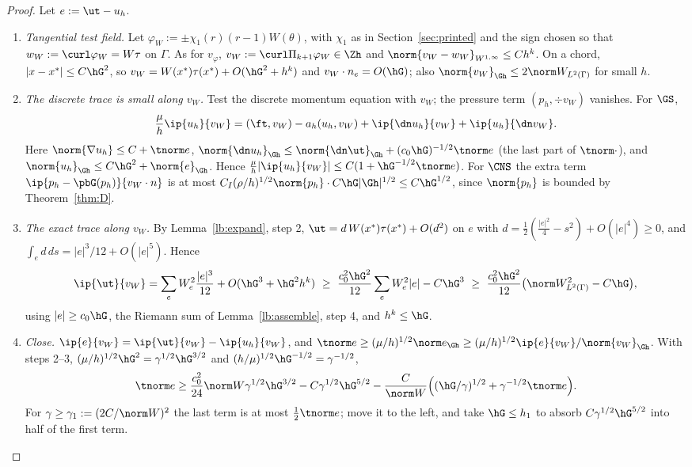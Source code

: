 \begin{proof}
Let $e:=\ut-u_h$.
\begin{enumerate}
\item \emph{Tangential test field.} Let $\varphi_W:=\pm\chi_1(r)(r-1)W(\theta)$, with $\chi_1$ as in Section~\ref{sec:printed} and the sign chosen so that $w_W:=\curl\varphi_W=W\tau$ on $\Gamma$. As for $v_\varphi$, $v_W:=\curl\Pi_{k+1}\varphi_W\in\Zh$ and $\norm{v_W-w_W}_{W^{1,\infty}}\le Ch^k$. On a chord, $|x-x^\ast|\le C\hG^2$, so $v_W=W(x^\ast)\tau(x^\ast)+O(\hG^2+h^k)$ and $v_W\cdot n_e=O(\hG)$; also $\norm{v_W}_{\Gh}\le2\norm W_{L^2(\Gamma)}$ for small $h$.
\item \emph{The discrete trace is small along $v_W$.} Test the discrete momentum equation with $v_W$; the pressure term $(p_h,\div v_W)$ vanishes. For $\GS$,
\[
\frac\mu h\ip{u_h}{v_W}=(\ft,v_W)-a_h(u_h,v_W)+\ip{\dn u_h}{v_W}+\ip{u_h}{\dn v_W} .
\]
Here $\norm{\nabla u_h}\le C+\tnorm e$, $\norm{\dn u_h}_{\Gh}\le\norm{\dn\ut}_{\Gh}+(c_0\hG)^{-1/2}\tnorm e$ (the last part of $\tnorm\cdot$), and $\norm{u_h}_{\Gh}\le C\hG^2+\norm{e}_{\Gh}$. Hence $\frac\mu h|\ip{u_h}{v_W}|\le C(1+\hG^{-1/2}\tnorm e)$. For $\CNS$ the extra term $\ip{p_h-\pbG(p_h)}{v_W\cdot n}$ is at most $C_I(\rho/h)^{1/2}\norm{p_h}\cdot C\hG|\Gh|^{1/2}\le C\hG^{1/2}$, since $\norm{p_h}$ is bounded by Theorem~\ref{thm:D}.
\item \emph{The exact trace along $v_W$.} By Lemma~\ref{lb:expand}, step 2, $\ut=d\,W(x^\ast)\tau(x^\ast)+O(d^2)$ on $e$ with $d=\frac12(\frac{|e|^2}4-s^2)+O(|e|^4)\ge0$, and $\int_ed\,ds=|e|^3/12+O(|e|^5)$. Hence
\[
\ip{\ut}{v_W}=\sum_{e}W_e^2\frac{|e|^3}{12}+O(\hG^3+\hG^2h^k)\ \ge\ \frac{c_0^2\hG^2}{12}\sum_eW_e^2|e|-C\hG^3\ \ge\ \frac{c_0^2\hG^2}{12}\bigl(\norm W^2_{L^2(\Gamma)}-C\hG\bigr),
\]
using $|e|\ge c_0\hG$, the Riemann sum of Lemma~\ref{lb:assemble}, step 4, and $h^k\le\hG$.
\item \emph{Close.} $\ip{e}{v_W}=\ip{\ut}{v_W}-\ip{u_h}{v_W}$, and $\tnorm e\ge(\mu/h)^{1/2}\norm e_{\Gh}\ge(\mu/h)^{1/2}\ip{e}{v_W}/\norm{v_W}_{\Gh}$. With steps 2--3, $(\mu/h)^{1/2}\hG^2=\gamma^{1/2}\hG^{3/2}$ and $(h/\mu)^{1/2}\hG^{-1/2}=\gamma^{-1/2}$,
\[
\tnorm e\ge\frac{c_0^2}{24}\norm W\gamma^{1/2}\hG^{3/2}-C\gamma^{1/2}\hG^{5/2}-\frac{C}{\norm W}\Bigl((\hG/\gamma)^{1/2}+\gamma^{-1/2}\tnorm e\Bigr).
\]
For $\gamma\ge\gamma_1:=(2C/\norm W)^2$ the last term is at most $\frac12\tnorm e$; move it to the left, and take $\hG\le h_1$ to absorb $C\gamma^{1/2}\hG^{5/2}$ into half of the first term.\qedhere
\end{enumerate}
\end{proof}

